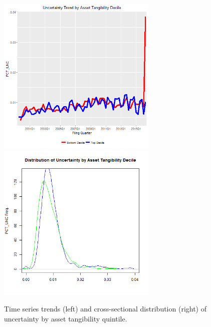 \begin{figure}[H] 
\centering
\includegraphics[width=3in, height=3in]{figures/punc-by-tang-ts}
\includegraphics[width=3in, height=3in]{figures/punc-by-tang-xs}
\captionsetup{justification=centering, width=.95\textwidth} 
\caption{\footnotesize Time series trends (left) and cross-sectional distribution (right) of uncertainty by asset tangibility quintile.} \label{bunc-tang}
\end{figure} 
